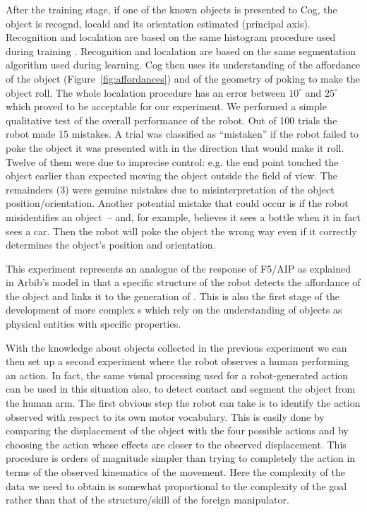 After the training stage, if one of the known objects is presented to Cog, the 
object is recogn\ize{}d, local\ize{}d and its orientation estimated (principal 
axis). 
\ifrevised
Recognition and local\iz{}ation are based on the same
\ahhcolor{} histogram procedure used during training \cite{swain91color}.
\else
Recognition and local\iz{}ation are based on the same \ahhcolor{} 
segmentation algorithm used during learning. 
\fi
Cog then uses its 
understanding of the affordance of the object (Figure~\ref{fig:affordances}) 
and of the geometry of poking to make the object roll. 
The whole local\iz{}ation 
procedure has an error between $10^{\circ}$ and $25^{\circ}$ which proved 
to be acceptable for our experiment. We performed a simple qualitative test of 
the overall performance of the robot. Out of 100 trials the robot made 15 
mistakes. 
\ifrevised
A trial was classified as ``mistaken'' if the robot failed to poke
the object it was presented with in the direction that would 
make it roll.
\fi
Twelve of them were due to imprecise control: e.g. the end point 
touched the object earlier than expected moving the object
outside the field of 
view. The remainders (3) were genuine mistakes due to misinterpretation of 
the object position/orientation.
%
\ifrevised
%
Another potential mistake that could occur is if the robot
misidentifies an object~-- and, for example, believes it sees a bottle
when it in fact sees a car.  Then the robot will poke the object the
wrong way even if it correctly determines the object's position and
orientation.
%
\fi


This experiment represents an analogue of the response of F5/AIP as 
explained in Arbib's model \cite{fagg-arbib-1998} in that a specific 
structure of the robot detects the affordance of the object and links 
it to the generation of \ahhbehavior{}. This is also the first stage of 
the development of more complex \ahhbehavior{}s which rely on the understanding 
of objects as physical entities with specific properties.

With the knowledge about objects collected in the previous experiment
we can then set up a second experiment where the robot observes a human performing an action. In fact, the same visual processing 
used for \ahhanalyzing{} a robot-generated action can be used in this situation also, to detect contact and 
segment the object from the human arm. 
The first obvious step the robot can take is to identify the action 
observed with respect to its own motor vocabulary. This is easily done by 
comparing the displacement of the object with the four possible actions and 
by choosing the action whose effects are closer to the observed displacement. 
This procedure is orders of magnitude simpler than trying to completely 
\ahhcharacterize{} the action in terms of the observed kinematics of the movement. 
Here the complexity of the data we need to obtain is somewhat proportional 
to the complexity of the goal rather than that of the structure/skill of 
the foreign manipulator.

